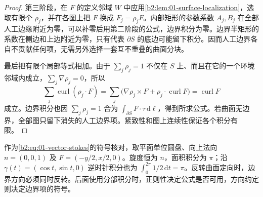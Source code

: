\begin{proof}
第三阶段，在 \(F\) 的定义邻域 \(W\) 中应用\cref{b2:lem:01-surface-localization}，选取有限个 \(\rho_j\)，并在各图上把 \(F\) 换成 \(F_j=\rho_j F\)。内部矩形的参数系数 \(A_j,B_j\) 在全部人工边缘附近为零，可以补零后用第二阶段的公式，边界积分为零。边界半矩形的系数在侧边和上边附近为零，只有代表 \(\partial S\) 的底边可能留下积分。因而人工边界各自不贡献任何项，无需另外选择一套互不重叠的曲面分块。

最后把有限个局部等式相加。由于 \(\sum_j\rho_j=1\) 不仅在 \(S\) 上、而且在它的一个环境邻域内成立，\(\sum_j\nabla\rho_j=0\)，所以
\[
 \sum_j\operatorname{curl}(\rho_j\cdot F)
 =\sum_j\bigl(\nabla\rho_j\times F
                   +\rho_j\cdot\operatorname{curl}F\bigr)
 =\operatorname{curl}F
\]
成立。边界积分也因 \(\sum_j\rho_j=1\) 合为 \(\int_{\partial S}F\cdot\tau\,\mathrm d\ell\)，得到所求公式。若曲面无边界，全部图只留下消失的人工边界项。紧致性和图上连续性保证各个积分有限。
\end{proof}

作为\eqref{b2:eq:01-vector-stokes}的符号核对，取平面单位圆盘、向上法向 \(n=(0,0,1)\) 及 \(F=(-y/2,x/2,0)\)。旋度恒为 \(n\)，面积积分为 \(\pi\)；沿 \(\gamma(t)=(\cos t,\sin t,0)\) 逆时针积分也为 \(\int_0^{2\pi}1/2\,\mathrm dt=\pi\)。反转曲面定向时，边界方向必须同时反转。后面使用分部积分时，正则性决定公式是否可用，方向约定则决定边界项的符号。
